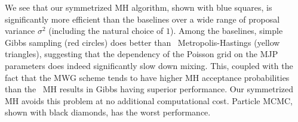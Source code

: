 
  We see that our symmetrized MH algorithm, shown with blue squares, is significantly more efficient than the baselines over a wide range of proposal variance $\sigma^2$ (including the natural choice of $1$).
  Among the baselines, simple Gibbs sampling (red circles) does better than \naive\ Metropolis-Hastings (yellow triangles), suggesting that the dependency of the Poisson grid on the MJP parameters does indeed significantly slow down mixing. This, coupled with the fact that the MWG scheme tends to have higher MH acceptance probabilities than the \naive\ MH results in Gibbs having superior performance. 
  Our symmetrized MH avoids this problem at no additional computational cost.
Particle MCMC, shown with black diamonds, has the worst performance. 

